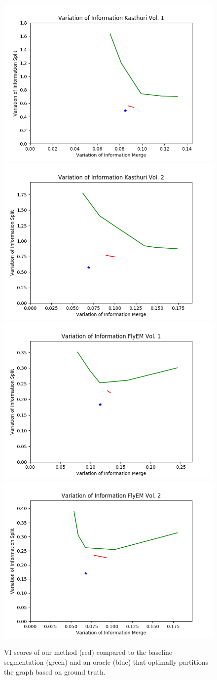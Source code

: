 
\begin{figure}[t!]
	\centering
	\includegraphics[width=0.45\linewidth]{./figures/variation_of_information-microns-train-600.png}
	\includegraphics[width=0.45\linewidth]{./figures/variation_of_information-microns-test-600.png}
	\includegraphics[width=0.45\linewidth]{./figures/variation_of_information-FlyEM-train-600.png}
	\includegraphics[width=0.45\linewidth]{./figures/variation_of_information-FlyEM-test-600.png}
	\caption{VI scores of our method (red) compared to the baseline segmentation (green) and an oracle (blue) that optimally partitions the graph based on ground truth.}
	\label{fig:variation-of-information}
\end{figure}


